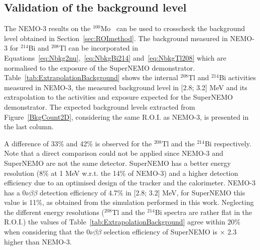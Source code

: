\documentclass[main.tex]{subfiles}
\begin{document}
\FloatBarrier


\subsection{Validation of the background level}


\NI The NEMO-3 results on the $^{\text{100}}$Mo~\cite{NEMO3:Mo100} can be used to crosscheck the background level obtained in Section~\ref{sec:ROImethod}. The background measured in NEMO-3 for $^{\text{214}}$Bi and $^{\text{208}}$Tl can be incorporated in Equations~\ref{eq:Nbkg2nu},~\ref{eq:NbkgBi214} and~\ref{eq:NbkgTl208} which are normalised to the exposure of the SuperNEMO demonstrator. Table~\ref{tab:ExtrapolationBackground} shows the internal $^{\text{208}}$Tl and $^{\text{214}}$Bi activities measured in NEMO-3, the measured background level in [2.8; 3.2] MeV and its extrapolation to the activities and exposure expected for the SuperNEMO demonstrator. The expected background levels extracted from Figure~\ref{BkgCount2D}, considering the same R.O.I. as NEMO-3, is presented in the last column.


\bigskip


\NI A difference of 33\% and 42\% is observed for the $^{\text{208}}$Tl and the $^{\text{214}}$Bi respectively. Note that a direct comparison could not be applied since NEMO-3 and SuperNEMO are not the same detector. SuperNEMO has a better energy resolution (8\% at 1 MeV w.r.t. the 14\% of NEMO-3) and a higher detection efficiency due to an optimised design of the tracker and the calorimeter. NEMO-3 has a 0$\nu\beta\beta$ detection efficiency of 4.7\% in [2.8; 3.2] MeV, for SuperNEMO this value is 11\%, as obtained from the simulation performed in this work. Neglecting the different energy resolutions ($^{\text{208}}$Tl and the $^{\text{214}}$Bi spectra are rather flat in the R.O.I.) the values of Table~\ref{tab:ExtrapolationBackground} agree within 20\% when considering that the 0$\nu\beta\beta$ selection efficiency of SuperNEMO is $\times$ 2.3 higher than NEMO-3.
\end{document}
